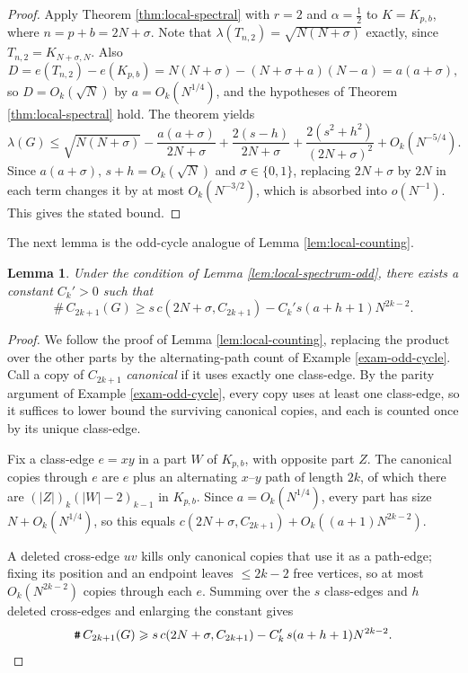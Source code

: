 \documentclass[11pt,a4paper]{article}
\newtheorem{lemma}[theorem]{Lemma}
\theoremstyle{definition}
\theoremstyle{plain}
\renewcommand{\le}{\leqslant}
\renewcommand{\ge}{\geqslant}
\begin{document}
\begin{proof}
Apply Theorem \ref{thm:local-spectral} with $r=2$ and
$\alpha=\tfrac12$ to $K=K_{p,b}$, where
$n=p+b=2N+\sigma$. Note that
$\lambda(T_{n,2})=\sqrt{N(N+\sigma)}$ exactly, since
$T_{n,2}=K_{N+\sigma,N}$. Also
\[
  D=e(T_{n,2})-e(K_{p,b})
   =N(N+\sigma)-(N+\sigma+a)(N-a)
   =a(a+\sigma),
\]
so $D=O_k(\sqrt N)$ by $a=O_k(N^{1/4})$, and the
hypotheses of Theorem \ref{thm:local-spectral} hold.
The theorem yields
\[
  \lambda(G)\le\sqrt{N(N+\sigma)}
   -\frac{a(a+\sigma)}{2N+\sigma}
   +\frac{2(s-h)}{2N+\sigma}
   +\frac{2(s^2+h^2)}{(2N+\sigma)^2}
   +O_k(N^{-5/4}).
\]
Since $a(a+\sigma),\,s+h=O_k(\sqrt N)$ and
$\sigma\in\{0,1\}$, replacing $2N+\sigma$ by $2N$ in
each term changes it by at most $O_k(N^{-3/2})$,
which is absorbed into $o(N^{-1})$. This gives the
stated bound.
\end{proof}


The next lemma is the odd-cycle analogue of Lemma \ref{lem:local-counting}. 

\begin{lemma}\label{lem:local-counting-odd}
Under the condition of Lemma \ref{lem:local-spectrum-odd}, there exists a constant $C_k'>0$ such that
\[
       \texttt{\#}\, {C_{2k+1}}(G)
        \ge
        s\,c(2N+\sigma,C_{2k+1})
        -C_k' s(a+h+1)N^{2k-2}.
\]
\end{lemma}

\begin{proof}
We follow the proof of Lemma \ref{lem:local-counting}, replacing the
product over the other parts by the alternating-path
count of Example \ref{exam-odd-cycle}. 
Call a copy of $C_{2k+1}$ \emph{canonical} if it uses
exactly one class-edge. By the parity argument of Example
\ref{exam-odd-cycle}, every copy uses at least one
class-edge, so it suffices to lower bound the surviving
canonical copies, and each is counted once by its unique
class-edge.

Fix a class-edge $e=xy$ in a part $W$ of $K_{p,b}$, with
opposite part $Z$. The canonical copies through $e$ are
$e$ plus an alternating $x$--$y$ path of length $2k$, of
which there are $(|Z|)_k(|W|-2)_{k-1}$ in $K_{p,b}$. Since
$a=O_k(N^{1/4})$, every part has size $N+O_k(N^{1/4})$, so
this equals $c(2N+\sigma,C_{2k+1})+O_k((a+1)N^{2k-2})$.

A deleted cross-edge $uv$ kills only canonical copies that
use it as a path-edge; fixing its position and an endpoint
leaves $\le 2k-2$ free vertices, so at most
$O_k(N^{2k-2})$ copies through each $e$. Summing over the
$s$ class-edges and $h$ deleted cross-edges and enlarging
the constant gives
\[
    \texttt{\#}\,C_{2k+1}(G)
    \ge s\,c(2N+\sigma,C_{2k+1})
        -C_k'\,s(a+h+1)N^{2k-2}. \qedhere
\] 
\end{proof}
\end{document}
